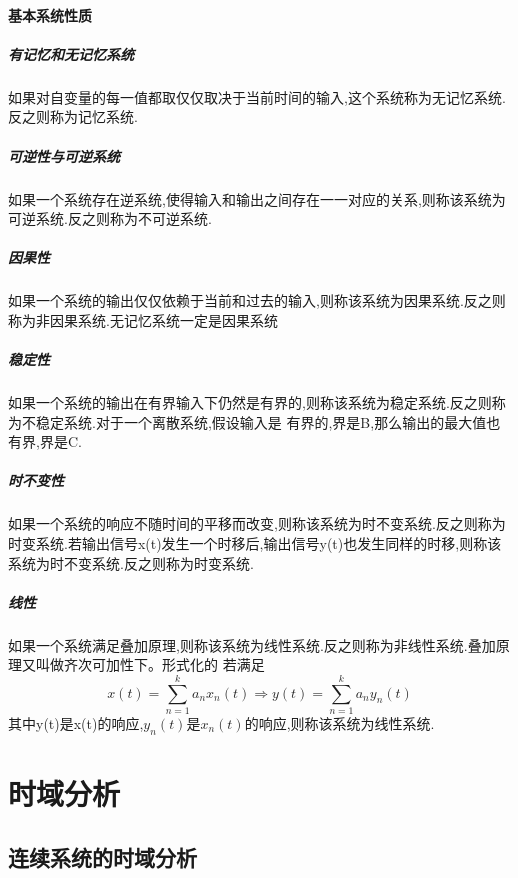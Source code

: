 \subsection{基本系统性质}
\subsubsection{有记忆和无记忆系统}
\qquad 如果对自变量的每一值都取仅仅取决于当前时间的输入,这个系统称为无记忆系统.反之则称为记忆系统.
\subsubsection{可逆性与可逆系统}
\qquad 如果一个系统存在逆系统,使得输入和输出之间存在一一对应的关系,则称该系统为可逆系统.反之则称为不可逆系统.
\subsubsection{因果性}
\qquad 如果一个系统的输出仅仅依赖于当前和过去的输入,则称该系统为因果系统.反之则称为非因果系统.无记忆系统一定是因果系统
\subsubsection{稳定性}
\qquad 如果一个系统的输出在有界输入下仍然是有界的,则称该系统为稳定系统.反之则称为不稳定系统.对于一个离散系统,假设输入是
有界的,界是B,那么输出的最大值也有界,界是C.
\subsubsection{时不变性}
\qquad 如果一个系统的响应不随时间的平移而改变,则称该系统为时不变系统.反之则称为时变系统.若输出信号x(t)发生一个时移后,输出信号y(t)也发生同样的时移,则称该系统为时不变系统.反之则称为时变系统.
\subsubsection{线性}
\qquad 如果一个系统满足叠加原理,则称该系统为线性系统.反之则称为非线性系统.叠加原理又叫做齐次可加性下。形式化的
若满足
\[
x(t)=\sum_{n=1}^{k}a_n x_n(t)\Rightarrow y(t)=\sum_{n=1}^{k}a_n y_n(t)
\]
其中y(t)是x(t)的响应,$y_n(t)$是$x_n(t)$的响应,则称该系统为线性系统.
\part{时域分析}

\chapter{连续系统的时域分析}
\chaptertoc

